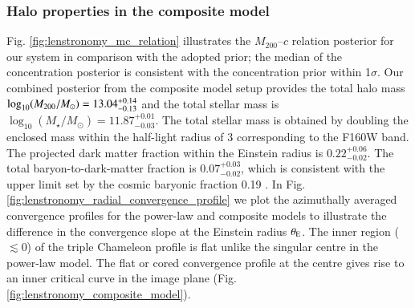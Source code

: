 \documentclass[longauth]{aa}
\newcommand{\ajs}[1]{{{#1}}}
\newcommand{\lreply}[1]{{{#1}}}
\begin{document}
\subsubsection{Halo properties in the composite model} \label{sec:lenstronomy_halo_properties}
\lreply{Fig.} \ref{fig:lenstronomy_mc_relation} illustrates the $M_{200}$--$c$ relation posterior for our system in comparison with the adopted prior; \ajs{the median of the concentration posterior is consistent with the concentration prior within 1$\sigma$.} Our combined posterior from the composite model setup provides the total halo mass $\log_{10} (M_{\rm 200}/M_{\odot}) = 13.04_{-0.13}^{+0.14}$ 
and the total stellar mass is $\log_{10} (M_{\star}/M_{\odot}) = 11.87_{-0.03}^{+0.01}$. 
\ajs{The total stellar mass is obtained by doubling the enclosed mass within the half-light radius of 3\farcs2 corresponding to the F160W band.}
The projected dark matter fraction within the Einstein radius is $0.22^{+0.06}_{-0.02}$. \ajs{The total baryon-to-dark-matter fraction is $0.07_{-0.02}^{+0.03}$, which is consistent with the upper limit set by the cosmic baryonic fraction 0.19 \citep{PlanckCollaboration18}.}
In Fig. \ref{fig:lenstronomy_radial_convergence_profile} we plot the azimuthally averaged convergence profiles for the power-law and composite models to  illustrate the difference in the convergence slope at the Einstein radius $\theta_{\rm E}$. The inner region ($\lesssim$0) of the triple Chameleon profile is flat unlike the singular centre in the power-law model. The flat or cored convergence profile at the centre gives rise to an inner critical curve in the image plane (Fig. \ref{fig:lenstronomy_composite_model}). %
\end{document}
